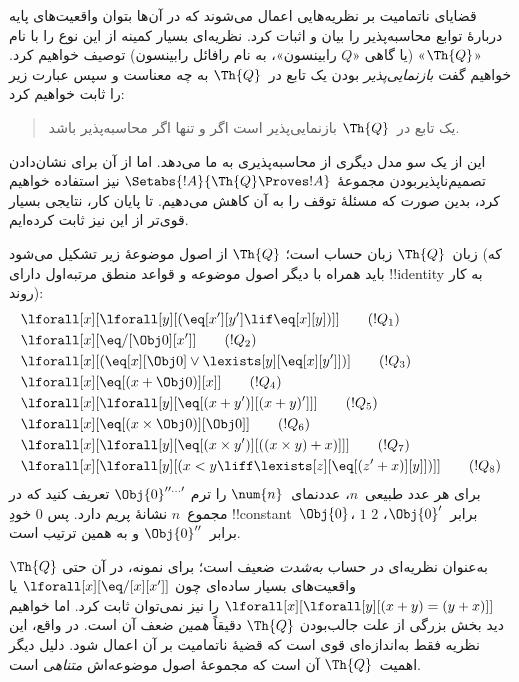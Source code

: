 \documentclass[../../../include/open-logic-section]{subfiles}
\begin{document}

قضایای ناتمامیت بر نظریه‌هایی اعمال می‌شوند که در آن‌ها بتوان
واقعیت‌های پایه دربارهٔ توابع محاسبه‌پذیر را بیان و اثبات کرد. نظریه‌ای
بسیار کمینه از این نوع را با نام «$\Th{Q}$» (یا گاهی «$Q$ رابینسون»،
به نام رافائل رابینسون) توصیف خواهیم کرد. خواهیم گفت
\emph{بازنمایی‌پذیر} بودن یک تابع در~$\Th{Q}$ به چه معناست و سپس
عبارت زیر را ثابت خواهیم کرد:
\begin{quote}
  یک تابع در~$\Th{Q}$ بازنمایی‌پذیر است اگر و تنها اگر
  محاسبه‌پذیر باشد.
\end{quote}
این از یک سو مدل دیگری از محاسبه‌پذیری به ما می‌دهد. اما از آن برای
نشان‌دادن تصمیم‌ناپذیربودن مجموعهٔ
$\Setabs{!A}{\Th{Q} \Proves !A}$ نیز استفاده خواهیم کرد، بدین صورت
که مسئلهٔ توقف را به آن کاهش می‌دهیم. تا پایان کار، نتایجی بسیار
قوی‌تر از این نیز ثابت کرده‌ایم.

زبان~$\Th{Q}$ زبان حساب است؛ $\Th{Q}$ از اصول موضوعهٔ زیر تشکیل
می‌شود (که باید همراه با دیگر اصول موضوعه و قواعد منطق مرتبه‌اول
دارای !!{identity} به کار روند):
\begin{align*}
& \lforall[x][\lforall[y][(\eq[x'][y'] \lif \eq[x][y])]] \tag{$!Q_1$}\\
& \lforall[x][\eq/[\Obj 0][x']] \tag{$!Q_2$}\\
& \lforall[x][(\eq[x][\Obj 0] \lor \lexists[y][\eq[x][y']])] \tag{$!Q_3$}\\
& \lforall[x][\eq[(x + \Obj 0)][x]] \tag{$!Q_4$}\\
& \lforall[x][\lforall[y][\eq[(x + y')][(x + y)']]] \tag{$!Q_5$}\\
& \lforall[x][\eq[(x \times \Obj 0)][\Obj 0]] \tag{$!Q_6$}\\
& \lforall[x][\lforall[y][\eq[(x \times y')][((x \times y) + x)]]] \tag{$!Q_7$}\\
& \lforall[x][\lforall[y][(x < y \liff \lexists[z][\eq[(z' + x)][y]])]] \tag{$!Q_8$}
\end{align*}
برای هر عدد طبیعی~$n$، عددنمای~$\num{n}$ را ترم
$\Obj{0}^{\prime\prime\ldots\prime}$ تعریف کنید که در مجموع~$n$
نشانهٔ پریم دارد. پس $\num{0}$ خودِ !!{constant}~$\Obj{0}$،
$\num{1}$ برابر~$\Obj{0}'$، $\num{2}$ برابر~$\Obj{0}''$ و به همین
ترتیب است.

$\Th{Q}$ به‌عنوان نظریه‌ای در حساب \emph{به‌شدت} ضعیف است؛ برای
نمونه، در آن حتی واقعیت‌های بسیار ساده‌ای چون
$\lforall[x][\eq/[x][x']]$ یا $\lforall[x][\lforall[y][(x+y)=(y+x)]]$
را نیز نمی‌توان ثابت کرد. اما خواهیم دید بخش بزرگی از علت جالب‌بودن
$\Th{Q}$ دقیقاً \emph{همین} ضعف آن است. در واقع، این نظریه فقط
به‌اندازه‌ای قوی است که قضیهٔ ناتمامیت بر آن اعمال شود. دلیل دیگر
اهمیت~$\Th{Q}$ آن است که مجموعهٔ اصول موضوعه‌اش \emph{متناهی} است.
\end{document}
